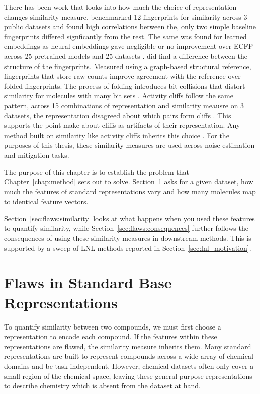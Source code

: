 There has been work that looks into how much the choice of representation changes similarity measure. \citet{Riniker2013} benchmarked 12 fingerprints for similarity across 3 public datasets and found high correlations between the, only two simple baseline fingerprints differed signficantly from the rest. The same was found for learned embeddings as neural embeddings gave negligible or no improvement over ECFP across 25 pretrained models and 25 datasets \citep{Praski2025}. \citet{Huber2026} did find a difference between the structure of the fingerprints. Measured using a graph-based structural reference, fingerprints that store raw counts improve agreement with the reference over folded fingerprints. The process of folding introduces bit collisions that distort similarity for molecules with many bit sets \citep{Huber2026}. Activity cliffs follow the same pattern, across 15 combinations of representation and similarity meausre on 3 datasets, the representation disagreed about which pairs form cliffs \citep{DabrowskiTumanski2026}. This supports the point \citet{MedinaFranco2013} make about cliffs as artifacts of their representation. Any method built on similarity like activity cliffs inherits this choice \citet{Wilson1972}. For the purposes of this thesis, these similarity measures are used across noise estimation and mitigation tasks. 

The purpose of this chapter is to establish the problem that Chapter~\ref{chap:method} sets out to solve. Section~\ref{sec:flaws:representations} asks for a given dataset, how much the features of standard representations vary and how many molecules map to identical feature vectors. 

Section~\ref{sec:flaws:similarity} looks at what happens when you used these features to quantify similarity, while Section~\ref{sec:flaws:consequences} further follows the consequences of using these similarity measures in downstream methods. This is supported by a sweep of LNL methods reported in Section~\ref{sec:lnl_motivation}.


\section{Flaws in Standard Base Representations}\label{sec:flaws:representations} %

To quantify similarity between two compounds, we must first choose a representation to encode each compound. If the features within these representations are flawed, the similarity measure inherits them. Many standard representations are built to represent compounds across a wide array of chemical domains and be task-independent. However, chemical datasets often only cover a small region of the chemical space, leaving these general-purpose representations to describe chemistry which is absent from the dataset at hand. 

